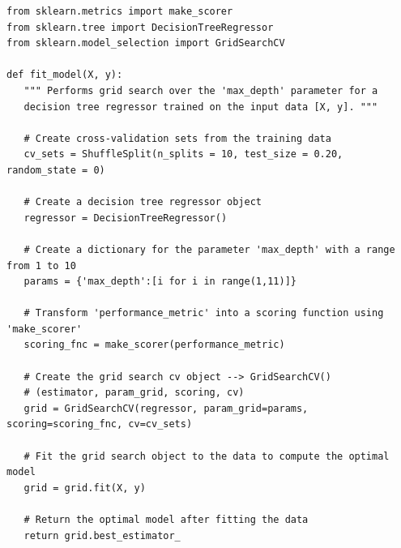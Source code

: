 \documentclass[12pt]{article}
\begin{document}
\begin{lstlisting}
from sklearn.metrics import make_scorer
from sklearn.tree import DecisionTreeRegressor
from sklearn.model_selection import GridSearchCV

def fit_model(X, y):
   """ Performs grid search over the 'max_depth' parameter for a 
   decision tree regressor trained on the input data [X, y]. """

   # Create cross-validation sets from the training data
   cv_sets = ShuffleSplit(n_splits = 10, test_size = 0.20, random_state = 0)

   # Create a decision tree regressor object
   regressor = DecisionTreeRegressor()

   # Create a dictionary for the parameter 'max_depth' with a range from 1 to 10
   params = {'max_depth':[i for i in range(1,11)]}

   # Transform 'performance_metric' into a scoring function using 'make_scorer' 
   scoring_fnc = make_scorer(performance_metric)

   # Create the grid search cv object --> GridSearchCV()
   # (estimator, param_grid, scoring, cv) 
   grid = GridSearchCV(regressor, param_grid=params, scoring=scoring_fnc, cv=cv_sets)

   # Fit the grid search object to the data to compute the optimal model
   grid = grid.fit(X, y)

   # Return the optimal model after fitting the data
   return grid.best_estimator_
\end{lstlisting}
\clearpage



\clearpage

	
\end{document}
